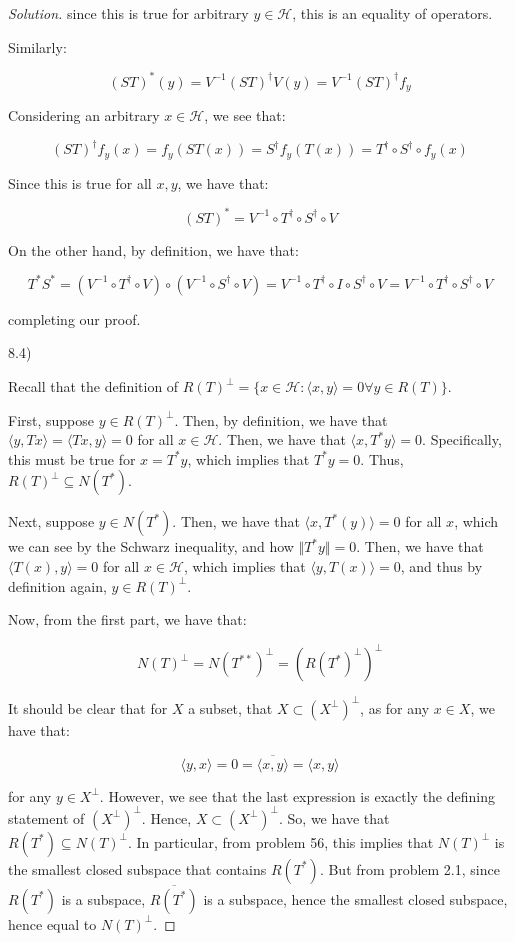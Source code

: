 \documentclass[10pt]{article}
\begin{document}
\begin{proof}[Solution]
since this is true for arbitrary $y \in \mathcal{H}$, this is an equality of operators.

Similarly:

$$ (ST)^*(y) = V^{-1} (ST)^\dag V(y) = V^{-1} (ST)^\dag f_y$$

Considering an arbitrary $x\in \mathcal{H}$, we see that:

$$(ST)^\dag f_y(x) = f_y(ST(x)) = S^\dag f_y(T(x)) = T^\dag \circ S^\dag \circ f_y(x)$$

Since this is true for all $x, y$, we have that:

$$(ST)^* = V^{-1} \circ T^\dag \circ S^\dag \circ V$$

On the other hand, by definition, we have that:

$$ T^* S^* = (V^{-1}\circ T^\dag \circ V) \circ (V^{-1} \circ S^\dag \circ V) = V^{-1} \circ T^\dag \circ I \circ S^\dag \circ V = V^{-1} \circ T^\dag \circ S^\dag \circ V$$

completing our proof.

8.4)

Recall that the definition of $R(T)^\perp = \{ x \in \mathcal{H} : \langle x, y \rangle = 0 \forall y \in R(T) \}$.

First, suppose $y \in R(T)^\perp$. Then, by definition, we have that $\langle y, Tx \rangle = \langle Tx, y \rangle = 0$ for all $x \in \mathcal{H}$. Then, we have that $\langle x , T^*y \rangle =  0$. Specifically, this must be true for $x = T^*y$, which implies that $T^*y = 0$. Thus, $R(T)^\perp \subseteq N(T^*)$.

Next, suppose $y \in N(T^*)$. Then, we have that $\langle x, T^*(y) \rangle = 0$ for all $x$, which we can see by the Schwarz inequality, and how $\Vert T^*y \Vert = 0$. Then, we have that $\langle T(x), y \rangle = 0$ for all $x \in \mathcal{H}$, which implies that $\langle y, T(x) \rangle = 0$, and thus by definition again, $y \in R(T)^\perp$.

Now, from the first part, we have that:

$$N(T)^\perp = N(T^{**})^\perp = (R(T^*)^\perp)^\perp $$

It should be clear that for $X$ a subset, that $X \subset (X^\perp)^\perp$, as for any $x \in X$, we have that:

$$ \langle y, x \rangle = 0 = \overline{\langle x, y \rangle} = \langle x, y \rangle $$

for any $ y \in X^\perp$. However, we see that the last expression is exactly the defining statement of $(X^\perp)^\perp$. Hence, $X \subset (X^\perp)^\perp$. So, we have that $R(T^*) \subseteq N(T)^\perp$. In particular, from problem 56, this implies that $N(T)^\perp$ is the smallest closed subspace that contains $R(T^*)$. But from problem 2.1, since $R(T^*)$ is a subspace, $\overline{R(T^*)}$ is a subspace, hence the smallest closed subspace, hence equal to $N(T)^\perp$.


\end{proof}
\end{document}
